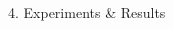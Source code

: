 \begin{frame}[t]
\begin{columns}[t,totalwidth=\textwidth]
\begin{column}{0.3\textwidth}
\begin{block}{4. Experiments \& Results}
   \vspace{0.5cm}


\end{block}
\end{column}
\end{columns}
\end{frame}
